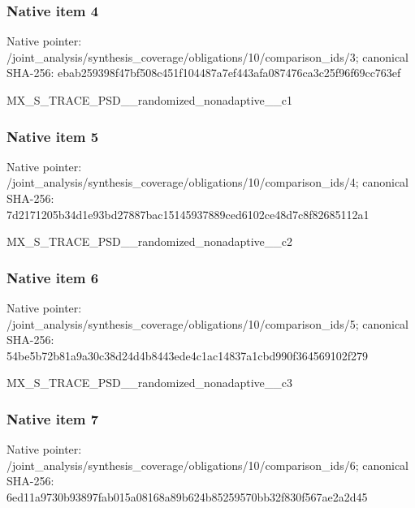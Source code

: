 \documentclass[10pt,a4paper]{article}
\begin{document}
\subsubsection{Native item 4}
Native pointer: /joint\_\allowbreak{}analysis/synthesis\_\allowbreak{}coverage/obligations/10/comparison\_\allowbreak{}ids/3; canonical SHA-256: ebab259398f47bf508c451f104487a7ef443afa087476ca3c25f96f69cc763ef

\begingroup\raggedright\sloppy MX\_\allowbreak{}S\_\allowbreak{}TRACE\_\allowbreak{}PSD\_\allowbreak{}\_\allowbreak{}randomized\_\allowbreak{}nonadaptive\_\allowbreak{}\_\allowbreak{}c1\par\endgroup

\subsubsection{Native item 5}
Native pointer: /joint\_\allowbreak{}analysis/synthesis\_\allowbreak{}coverage/obligations/10/comparison\_\allowbreak{}ids/4; canonical SHA-256: 7d2171205b34d1e93bd27887bac15145937889ced6102ce48d7c8f82685112a1

\begingroup\raggedright\sloppy MX\_\allowbreak{}S\_\allowbreak{}TRACE\_\allowbreak{}PSD\_\allowbreak{}\_\allowbreak{}randomized\_\allowbreak{}nonadaptive\_\allowbreak{}\_\allowbreak{}c2\par\endgroup

\subsubsection{Native item 6}
Native pointer: /joint\_\allowbreak{}analysis/synthesis\_\allowbreak{}coverage/obligations/10/comparison\_\allowbreak{}ids/5; canonical SHA-256: 54be5b72b81a9a30c38d24d4b8443ede4c1ac14837a1cbd990f364569102f279

\begingroup\raggedright\sloppy MX\_\allowbreak{}S\_\allowbreak{}TRACE\_\allowbreak{}PSD\_\allowbreak{}\_\allowbreak{}randomized\_\allowbreak{}nonadaptive\_\allowbreak{}\_\allowbreak{}c3\par\endgroup

\subsubsection{Native item 7}
Native pointer: /joint\_\allowbreak{}analysis/synthesis\_\allowbreak{}coverage/obligations/10/comparison\_\allowbreak{}ids/6; canonical SHA-256: 6ed11a9730b93897fab015a08168a89b624b85259570bb32f830f567ae2a2d45
\end{document}
